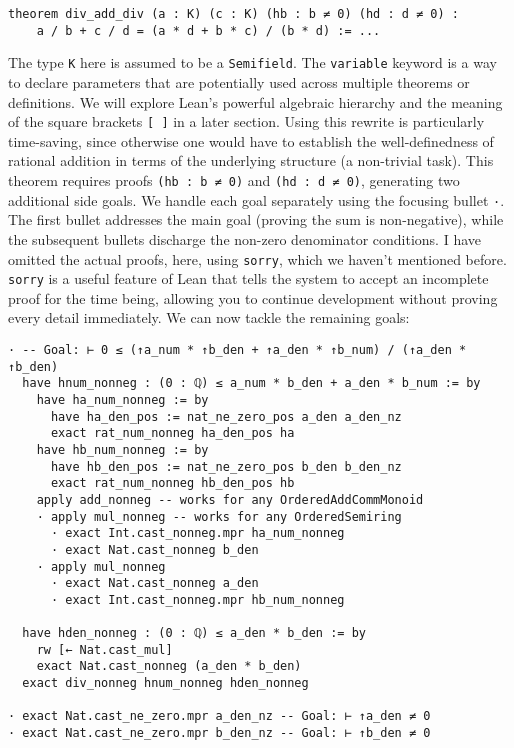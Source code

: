 \begin{example}
\begin{lstlisting}[language=lean]
theorem div_add_div (a : K) (c : K) (hb : b ≠ 0) (hd : d ≠ 0) :
    a / b + c / d = (a * d + b * c) / (b * d) := ...
\end{lstlisting}
  The type \lstinline[language=lean]|K| here is assumed to be a
  \lstinline[language=lean]|Semifield|. The \lstinline[language=lean]|variable|
  keyword is a way to declare parameters that are potentially used across
  multiple theorems or definitions. We will explore Lean's powerful algebraic
  hierarchy and the meaning of the square brackets \lstinline[language=lean]|[ ]|
  in a later section.
  Using this rewrite is particularly time-saving, since otherwise one would have to
  establish the well-definedness of rational addition in terms of the underlying
  structure (a non-trivial task).
  This theorem requires proofs \lstinline[language=lean]|(hb : b ≠ 0)| and
  \lstinline[language=lean]|(hd : d ≠ 0)|, generating two additional side goals.
  We handle each goal separately using the focusing bullet \lstinline[language=lean]|·|.
  The first bullet addresses the main goal (proving the sum is non-negative),
  while the subsequent bullets discharge the non-zero denominator conditions.
  I have omitted the actual proofs, here, using \lstinline[language=lean]|sorry|,
  which we haven't mentioned before. \lstinline[language=lean]|sorry| is a useful
  feature of Lean that tells the system to accept an incomplete proof for the time being,
  allowing you to continue development without proving every detail immediately.
  We can now tackle the remaining goals:
  \newpage
  \begin{lstlisting}[language=lean]
· -- Goal: ⊢ 0 ≤ (↑a_num * ↑b_den + ↑a_den * ↑b_num) / (↑a_den * ↑b_den)
  have hnum_nonneg : (0 : ℚ) ≤ a_num * b_den + a_den * b_num := by
    have ha_num_nonneg := by
      have ha_den_pos := nat_ne_zero_pos a_den a_den_nz
      exact rat_num_nonneg ha_den_pos ha
    have hb_num_nonneg := by
      have hb_den_pos := nat_ne_zero_pos b_den b_den_nz
      exact rat_num_nonneg hb_den_pos hb
    apply add_nonneg -- works for any OrderedAddCommMonoid
    · apply mul_nonneg -- works for any OrderedSemiring
      · exact Int.cast_nonneg.mpr ha_num_nonneg
      · exact Nat.cast_nonneg b_den
    · apply mul_nonneg
      · exact Nat.cast_nonneg a_den
      · exact Int.cast_nonneg.mpr hb_num_nonneg

  have hden_nonneg : (0 : ℚ) ≤ a_den * b_den := by
    rw [← Nat.cast_mul]
    exact Nat.cast_nonneg (a_den * b_den)
  exact div_nonneg hnum_nonneg hden_nonneg

· exact Nat.cast_ne_zero.mpr a_den_nz -- Goal: ⊢ ↑a_den ≠ 0
· exact Nat.cast_ne_zero.mpr b_den_nz -- Goal: ⊢ ↑b_den ≠ 0
\end{lstlisting}


\end{example}
